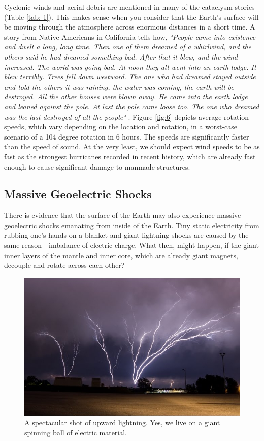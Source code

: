 \documentclass[10pt,twocolumn,letterpaper]{article}
\begin{document}
Cyclonic winds and aerial debris are mentioned in many of the cataclysm stories (Table \ref{tab: 1}). This makes sense when you consider that the Earth's surface will be moving through the atmosphere across enormous distances in a short time. A story from Native Americans in California tells how, \textit{"People came into existence and dwelt a long, long time. Then one of them dreamed of a whirlwind, and the others said he had dreamed something bad. After that it blew, and the wind increased. The world was going bad. At noon they all went into an earth lodge. It blew terribly. Trees fell down westward. The one who had dreamed stayed outside and told the others it was raining, the water was coming, the earth will be destroyed. All the other houses were blown away. He came into the earth lodge and leaned against the pole. At last the pole came loose too. The one who dreamed was the last destroyed of all the people"} \cite{17}. Figure \ref{fig:6} depicts average rotation speeds, which vary depending on the location and rotation, in a worst-case scenario of a 104 degree rotation in 6 hours. The speeds are significantly faster than the speed of sound. At the very least, we should expect wind speeds to be as fast as the strongest hurricanes recorded in recent history, which are already fast enough to cause significant damage to manmade structures.

\subsection{Massive Geoelectric Shocks}

There is evidence that the surface of the Earth may also experience massive geoelectric shocks emanating from inside of the Earth. Tiny static electricity from rubbing one's hands on a blanket and giant lightning shocks are caused by the same reason - imbalance of electric charge. What then, might happen, if the giant inner layers of the mantle and inner core, which are already giant magnets, decouple and rotate across each other?

\begin{figure}[t]
\begin{center}
   \includegraphics[width=1\linewidth]{lightning.jpg}
\end{center}
   \caption{A spectacular shot of upward lightning. Yes, we live on a giant spinning ball of electric material. \cite{22}}
\label{fig:7}
\label{fig:onecol}
\end{figure}
\end{document}
